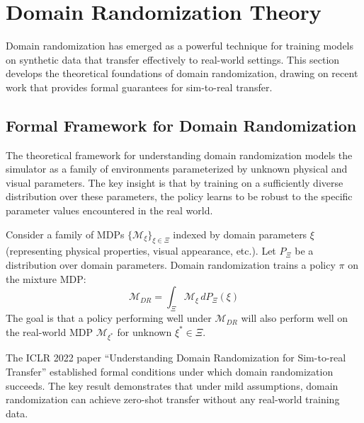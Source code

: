 \section{Domain Randomization Theory}
\label{sec:domain_randomization}

Domain randomization has emerged as a powerful technique for training models on synthetic data that transfer effectively to real-world settings. This section develops the theoretical foundations of domain randomization, drawing on recent work that provides formal guarantees for sim-to-real transfer.

\subsection{Formal Framework for Domain Randomization}
\label{subsec:dr_framework}

The theoretical framework for understanding domain randomization models the simulator as a family of environments parameterized by unknown physical and visual parameters. The key insight is that by training on a sufficiently diverse distribution over these parameters, the policy learns to be robust to the specific parameter values encountered in the real world.

\begin{definition}
\label{def:dr_framework}
Consider a family of MDPs $\{\mathcal{M}_\xi\}_{\xi \in \Xi}$ indexed by domain parameters $\xi$ (representing physical properties, visual appearance, etc.). Let $P_\Xi$ be a distribution over domain parameters. Domain randomization trains a policy $\pi$ on the mixture MDP:
\begin{equation}
\mathcal{M}_{DR} = \int_\Xi \mathcal{M}_\xi \, dP_\Xi(\xi)
\end{equation}
The goal is that a policy performing well under $\mathcal{M}_{DR}$ will also perform well on the real-world MDP $\mathcal{M}_{\xi^*}$ for unknown $\xi^* \in \Xi$.
\end{definition}

The ICLR 2022 paper ``Understanding Domain Randomization for Sim-to-real Transfer'' established formal conditions under which domain randomization succeeds. The key result demonstrates that under mild assumptions, domain randomization can achieve zero-shot transfer without any real-world training data.

